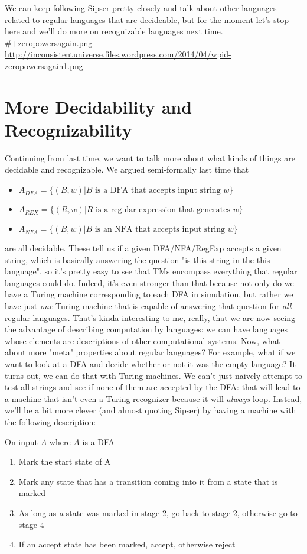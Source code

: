 \documentclass[11pt]{article}
\begin{document}
We can keep following Sipser pretty closely and talk about other languages related to regular languages that are decideable, but for the moment let's stop here and we'll do more on recognizable languages next time.
\#+zeropowersagain.png \url{http://inconsistentuniverse.files.wordpress.com/2014/04/wpid-zeropowersagain1.png}
\section{More Decidability and Recognizability}
\label{sec-13}
Continuing from last time, we want to talk more about what kinds of things are decidable and recognizable. We argued semi-formally last time that 

\begin{itemize}
\item $A_{DFA} = \{(B,w)| B \text{ is a DFA that accepts input string } w\}$
\item $A_{REX} = \{(R,w) | R \text{ is a regular expression that generates } w\}$
\item $A_{NFA} = \{(B,w) | B \text{ is an NFA that accepts input string } w\}$
\end{itemize}

are all decidable. These tell us if a given DFA/NFA/RegExp accepts a given string, which is basically answering the question "is this string in the this language", so it's pretty easy to see that TMs encompass everything that regular languages could do. Indeed, it's even stronger than that because not only do we have a Turing machine corresponding to each DFA in simulation, but rather we have just \emph{one} Turing machine that is capable of answering that question for \emph{all} regular languages. That's kinda interesting to me, really, that we are now seeing the advantage of describing computation by languages: we can have languages whose elements are descriptions of other computational systems. Now, what about more "meta" properties about regular languages? For example, what if we want to look at a DFA and decide whether or not it was the empty language? It turns out, we can do that with Turing machines. We can't just naively attempt to test all strings and see if none of them are accepted by the DFA: that will lead to a machine that isn't even a Turing recognizer because it will \emph{always} loop. Instead, we'll be a bit more clever (and almost quoting Sipser) by having a machine with the following description:

On input $A$ where $A$ is a DFA

\begin{enumerate}
\item Mark the start state of A
\item Mark any state that has a transition coming into it from a state that is marked
\item As long as \emph{a} state was marked in stage 2, go back to stage 2, otherwise go to stage 4
\item If an accept state has been marked, accept, otherwise reject
\end{enumerate}
\end{document}
